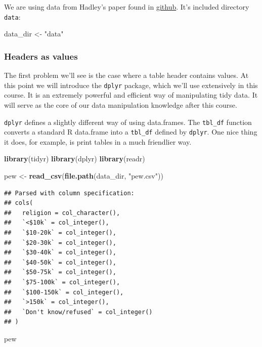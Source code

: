 \documentclass[]{article}
\newenvironment{Shaded}{\begin{snugshade}}{\end{snugshade}}
\newcommand{\KeywordTok}[1]{\textcolor[rgb]{0.13,0.29,0.53}{\textbf{{#1}}}}
\newcommand{\StringTok}[1]{\textcolor[rgb]{0.31,0.60,0.02}{{#1}}}
\newcommand{\NormalTok}[1]{{#1}}
\theoremstyle{definition}
\theoremstyle{definition}
\theoremstyle{remark}
\begin{document}
We are using data from Hadley's paper found in
\href{https://github.com/hadley/tidyr}{github}. It's included directory
\texttt{data}:

\begin{Shaded}
\begin{Highlighting}[]
\NormalTok{data_dir <-}\StringTok{ "data"}
\end{Highlighting}
\end{Shaded}

\subsubsection{Headers as values}\label{headers-as-values}

The first problem we'll see is the case where a table header contains
values. At this point we will introduce the \texttt{dplyr} package,
which we'll use extensively in this course. It is an extremely powerful
and efficient way of manipulating tidy data. It will serve as the core
of our data manipulation knowledge after this course.

\texttt{dplyr} defines a slightly different way of using data.frames.
The \texttt{tbl\_df} function converts a standard R data.frame into a
\texttt{tbl\_df} defined by \texttt{dplyr}. One nice thing it does, for
example, is print tables in a much friendlier way.

\begin{Shaded}
\begin{Highlighting}[]
\KeywordTok{library}\NormalTok{(tidyr)}
\KeywordTok{library}\NormalTok{(dplyr)}
\KeywordTok{library}\NormalTok{(readr)}

\NormalTok{pew <-}\StringTok{ }\KeywordTok{read_csv}\NormalTok{(}\KeywordTok{file.path}\NormalTok{(data_dir, }\StringTok{"pew.csv"}\NormalTok{))}
\end{Highlighting}
\end{Shaded}

\begin{verbatim}
## Parsed with column specification:
## cols(
##   religion = col_character(),
##   `<$10k` = col_integer(),
##   `$10-20k` = col_integer(),
##   `$20-30k` = col_integer(),
##   `$30-40k` = col_integer(),
##   `$40-50k` = col_integer(),
##   `$50-75k` = col_integer(),
##   `$75-100k` = col_integer(),
##   `$100-150k` = col_integer(),
##   `>150k` = col_integer(),
##   `Don't know/refused` = col_integer()
## )
\end{verbatim}

\begin{Shaded}
\begin{Highlighting}[]
\NormalTok{pew}
\end{Highlighting}
\end{Shaded}
\end{document}
